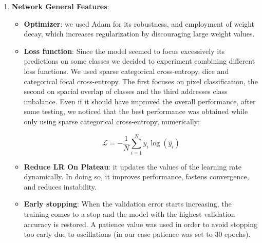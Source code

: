 \documentclass[11pt]{article}
\begin{document}
\begin{multicols}{2}
\begin{enumerate}
            \item \textbf{Network General Features}:
            \begin{itemize}
            
                \item \textbf{Optimizer}: we used Adam for its robustness, and employment of weight decay, which increases regularization by discouraging large weight values.
                
                \item \textbf{Loss function}: Since the model seemed to focus excessively its predictions on some classes we decided to experiment combining different loss functions. We used sparse categorical cross-entropy, dice and categorical focal cross-entropy. The first focuses on pixel classification, the second on spacial overlap of classes and the third addresses class imbalance. Even if it should have improved the overall performance, after some testing, we noticed that the best performance was obtained while only using sparse categorical cross-entropy, numerically:
                
                \[
                \mathcal{L} = -\frac{1}{N}\sum_{i=1}^{N} y_i\log(\hat{y}_i)
                \]
                
                \item \textbf{Reduce LR On Plateau}: it updates the values of the learning rate dynamically. In doing so, it improves performance, fastens convergence, and reduces instability.
                
                \item \textbf{Early stopping}: When the validation error starts increasing, the training comes to a stop and the model with the highest validation accuracy is restored. A patience value was used in order to avoid stopping too early due to oscillations (in our case patience was set to 30 epochs).
                
            \end{itemize}             
        \end{enumerate}
            

       


\end{multicols}
\end{document}
